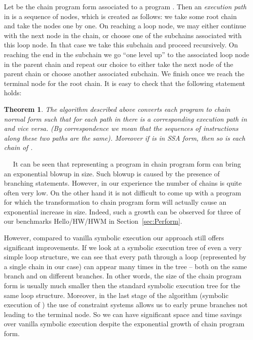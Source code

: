 \documentclass{llncs}
\newtheorem{thm}{Theorem}
\renewcommand{\paragraph}[1]{\vspace{0.2cm}\noindent{\bf #1}~~}
\begin{document}
Let  be the chain program form associated to a program . Then an
\emph{execution path} in  is a sequence of nodes, which is created as follows:
we take some root chain and take the nodes one by one. On reaching a loop
node, we may either continue with the next node in the chain, or choose one
of the subchains associated with this loop node. In that case we take this
subchain and proceed recursively. On reaching the end in the
subchain we go ``one level up'' to the associated loop node in the parent
chain and repeat our choice to either take the next node of the parent
chain or choose another associated subchain. We finish once we reach the
terminal node for the root chain. It is easy to check that the following
statement holds:

\begin{thm} 
  The algorithm described above converts each program  to chain normal
  form  such that for each path in  there is a corresponding execution path in
   and vice versa. (By correspondence we mean that the sequences of
  instructions along these two paths are the same).  Moreover if  is in
  SSA form, then so is each chain of .
\end{thm}

\paragraph{Exponential growth of chain program form}
It can be seen that representing a program  in chain program form can
bring an exponential blowup in size. Such blowup is caused by the presence
of branching statements. However, in our experience 
the number of chains is quite often very low. 
On the other hand it is not difficult to come up with a program for which the
transformation to chain program form will actually cause an exponential increase in
size. Indeed, such a growth can be observed for three of our benchmarks
Hello/HW/HWM in Section~\ref{sec:Perform}.

However, compared to vanilla symbolic execution our approach still offers significant
improvements. If we look at a symbolic execution tree of even a
very simple loop structure, we can see that every path through a loop
(represented by a single chain in our case) can appear many times in the tree -- both on
the same branch and on different branches. In other words, the size of the
chain program form is usually much smaller then the standard symbolic execution
tree for the same loop structure. Moreover, in the last stage of the
algorithm (symbolic execution of ) the use of constraint systems
allows us to early prune branches not leading to the terminal node. So we
can have significant space and time savings over vanilla symbolic execution despite
the exponential growth of chain program form.
\end{document}
